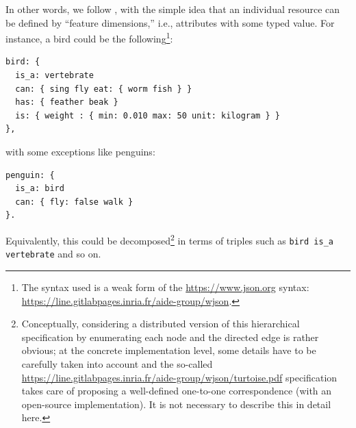 \documentclass[sn-mathphys]{sn-jnl}
\newcommand{\hhref}[1]{\href{#1}{#1}}
\begin{document}
In other words, we follow \cite{gardenfors_conceptual_2004}, with the simple idea that an individual resource can be defined by ``feature dimensions,'' i.e., attributes with some typed value. For instance, a bird could be the following\footnote{The syntax used is a weak form of the \href{JSON}{https://www.json.org} syntax: \hhref{https://line.gitlabpages.inria.fr/aide-group/wjson}.}:

\begin{lstlisting}[basicstyle=\small]
bird: {
  is_a: vertebrate
  can: { sing fly eat: { worm fish } }
  has: { feather beak }
  is: { weight : { min: 0.010 max: 50 unit: kilogram } }
},\end{lstlisting}
with some exceptions like penguins:
\begin{lstlisting}[basicstyle=\small]
penguin: {
  is_a: bird
  can: { fly: false walk }
}.
\end{lstlisting}

Equivalently, this could be decomposed\footnote{Conceptually, considering a distributed version of this hierarchical specification by enumerating each node and the directed edge is rather obvious; at the concrete implementation level, some details have to be carefully taken into account and the so-called \href{turtoise}{https://line.gitlabpages.inria.fr/aide-group/wjson/turtoise.pdf} specification takes care of proposing a well-defined one-to-one correspondence (with an open-source implementation). It is not necessary to describe this in detail here.} in terms of triples such as {\tt bird is\_a vertebrate} and so on.
\end{document}
